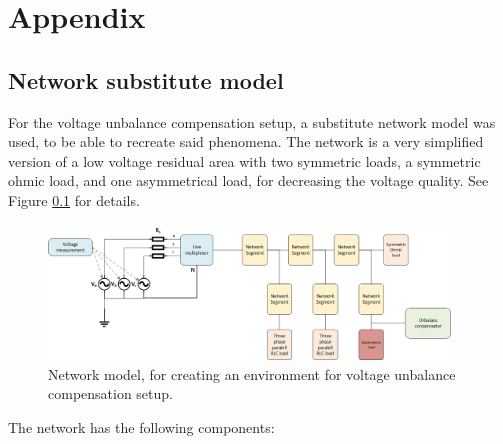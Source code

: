 \chapter*{Appendix}

\section{Network substitute model}\label{APPENDIX:sec:Network_substitute}

For the voltage unbalance compensation setup, a substitute network model was used, to be able to recreate said phenomena. The network is a very simplified version of a low voltage residual area with two symmetric loads, a symmetric ohmic load, and one asymmetrical load, for decreasing the voltage quality. See Figure \ref{fig:expnetwork} for details.

\begin{figure}[!ht]
            \centering
            \includegraphics[width=0.95\textwidth]{Unblance_EPS_Pics/Network.png}
            \caption{Network model, for creating an environment for voltage unbalance compensation setup.}
            \label{fig:expnetwork}
            \end{figure}

The network has the following components:

